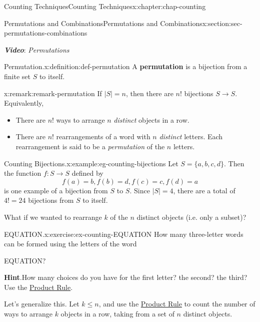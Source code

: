 \documentclass[oneside,10pt,]{book}
\newcommand{\blocktitlefont}{\relax}
\newcommand{\alert}[1]{\textbf{\textit{#1}}}
\newcommand{\terminology}[1]{\textbf{#1}}
\numberwithin{equation}{section}
\begin{document}
\begin{chapterptx}{Counting Techniques}{}{Counting Techniques}{}{}{x:chapter:chap-counting}
\begin{sectionptx}{Permutations and Combinations}{}{Permutations and Combinations}{}{}{x:section:sec-permutations-combinations}
\begin{sidebyside}{1}{0}{0}{0}
\end{sidebyside}%
\par
\alert{Video}: \emph{Permutations}%
\begin{definition}{Permutation.}{x:definition:def-permutation}%
A \terminology{permutation} is a bijection from a finite set \(S\) to itself.%
\end{definition}
\begin{remark}{}{x:remark:remark-permutation}%
If \(|S| = n\), then there are \(n!\) bijections \(S \rightarrow S\). Equivalently,%
\begin{itemize}[label=\textbullet]
\item{}There are \(n!\) ways to arrange \(n\) \emph{distinct} objects in a row.%
\item{}There are \(n!\) rearrangements of a word with \(n\) \emph{distinct} letters. Each rearrangement is said to be a \emph{permutation} of the \(n\) letters.%
\end{itemize}
%
\end{remark}
\begin{example}{Counting Bijections.}{x:example:eg-counting-bijections}%
Let \(S = \{a,b,c,d\}\). Then the function \(f: S \rightarrow S\) defined by%
\begin{equation*}
f(a) = b, f(b) = d, f(c) = c, f(d) = a
\end{equation*}
is one example of a bijection from \(S\) to \(S\). Since \(|S| = 4\), there are a total of \(4! = 24\) bijections from \(S\) to itself.%
\end{example}
What if we wanted to rearrange \(k\) of the \(n\) distinct objects (i.e. only a subset)?%
\begin{inlineexercise}{EQUATION.}{x:exercise:ex-counting-EQUATION}%
How many three-letter words can be formed using the letters of the word%
\begin{sidebyside}{1}{0.4}{0.4}{0}%
\begin{sbspanel}{0.2}%
EQUATION?%
\end{sbspanel}%
\end{sidebyside}%
\par\smallskip%
\noindent\textbf{\blocktitlefont Hint}.\hypertarget{g:hint:id526450}{}\quad{}How many choices do you have for the first letter? the second? the third? Use the \hyperref[x:principle:prin-prod-rule]{Product Rule}.%
\end{inlineexercise}%
Let's generalize this. Let \(k \leq n\), and use the \hyperref[x:principle:prin-prod-rule]{Product Rule} to count the number of ways to arrange \(k\) objects in a row, taking from a set of \(n\) distinct objects.%

\end{sectionptx}
\end{chapterptx}
\end{document}
